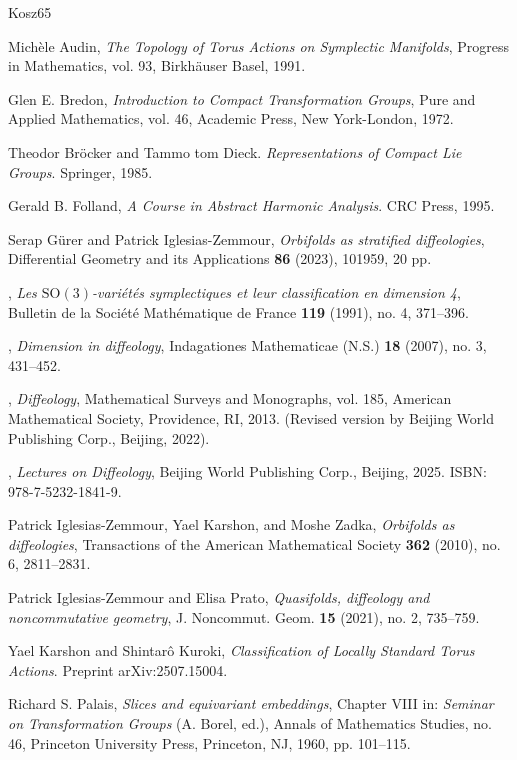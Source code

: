 \documentclass[10pt,reqno,letterpaper,twoside]{amsart}
\theoremstyle{article}
\begin{document}
  \begin{thebibliography}{Kosz65}
    
    Michèle Audin,
    \emph{The Topology of Torus Actions on Symplectic Manifolds},
    Progress in Mathematics, vol. 93, Birkhäuser Basel, 1991.
    
    Glen E. Bredon,
    \emph{Introduction to Compact Transformation Groups},
    Pure and Applied Mathematics, vol. 46, Academic Press, New York-London, 1972.
    
    Theodor Bröcker and Tammo tom Dieck.
    \emph{Representations of Compact Lie Groups}. Springer, 1985.
    
    Gerald B. Folland,
    \emph{A Course in Abstract Harmonic Analysis}.
    CRC Press, 1995.
    
    Serap G{\"u}rer and Patrick Iglesias-Zemmour,
    \emph{Orbifolds as stratified diffeologies},
    Differential Geometry and its Applications \textbf{86} (2023), 101959, 20 pp.
    
    \bysame,
    \emph{Les $\mathrm{SO}(3)$-vari{\'e}t{\'e}s symplectiques et leur classification en dimension 4},
    Bulletin de la Soci{\'e}t{\'e} Math{\'e}matique de France \textbf{119} (1991), no. 4, 371--396.
    
    \bysame,
    \emph{Dimension in diffeology},
    Indagationes Mathematicae (N.S.) \textbf{18} (2007), no. 3, 431--452.
    
    \bysame,
    \emph{Diffeology},
    Mathematical Surveys and Monographs, vol. 185, American Mathematical Society, Providence, RI, 2013.
    (Revised version by Beijing World Publishing Corp., Beijing, 2022).
    
    \bysame,
    \emph{Lectures on Diffeology},
    Beijing World Publishing Corp., Beijing, 2025. ISBN: 978-7-5232-1841-9.
    
    Patrick Iglesias-Zemmour, Yael Karshon, and Moshe Zadka,
    \emph{Orbifolds as diffeologies},
    Transactions of the American Mathematical Society \textbf{362} (2010), no. 6, 2811--2831.
    
    Patrick Iglesias-Zemmour and Elisa Prato,
    \emph{Quasifolds, diffeology and noncommutative geometry},
    J. Noncommut. Geom. \textbf{15} (2021), no. 2, 735--759.
    
    Yael Karshon and Shintar{\^o} Kuroki,
    \emph{Classification of Locally Standard Torus Actions}.
    Preprint arXiv:2507.15004.
    
    Richard S. Palais,
    \emph{Slices and equivariant embeddings},
    Chapter VIII in: \emph{Seminar on Transformation Groups} (A. Borel, ed.),
    Annals of Mathematics Studies, no. 46, Princeton University Press, Princeton, NJ, 1960, pp. 101--115.
    
  \end{thebibliography}
  
  
\end{document}
